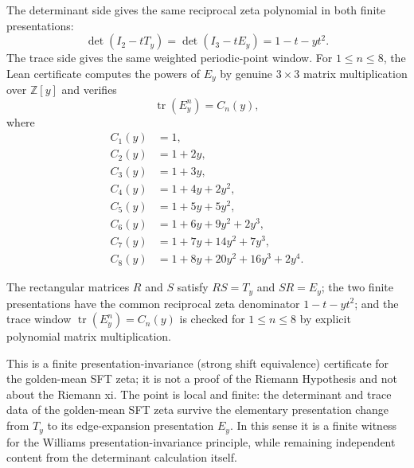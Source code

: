 The determinant side gives the same reciprocal zeta polynomial in both finite presentations:
$$
\det(I_2-tT_y)=\det(I_3-tE_y)=1-t-yt^2.
$$
The trace side gives the same weighted periodic-point window. For $1\le n\le 8$, the Lean certificate computes the powers of $E_y$ by genuine $3\times3$ matrix multiplication over $\mathbb Z[y]$ and verifies
$$
\operatorname{tr}(E_y^n)=C_n(y),
$$
where
$$
\begin{aligned}
C_1(y)&=1,\\
C_2(y)&=1+2y,\\
C_3(y)&=1+3y,\\
C_4(y)&=1+4y+2y^2,\\
C_5(y)&=1+5y+5y^2,\\
C_6(y)&=1+6y+9y^2+2y^3,\\
C_7(y)&=1+7y+14y^2+7y^3,\\
C_8(y)&=1+8y+20y^2+16y^3+2y^4.
\end{aligned}
$$

\begin{theorem}
\label{thm:window6-golden-mean-shift-equivalence-certificate}
The rectangular matrices $R$ and $S$ satisfy $RS=T_y$ and $SR=E_y$; the two finite presentations have the common reciprocal zeta denominator $1-t-yt^2$; and the trace window $\operatorname{tr}(E_y^n)=C_n(y)$ is checked for $1\le n\le 8$ by explicit polynomial matrix multiplication.
\end{theorem}

This is a finite presentation-invariance (strong shift equivalence) certificate for the golden-mean SFT zeta; it is not a proof of the Riemann Hypothesis and not about the Riemann xi. The point is local and finite: the determinant and trace data of the golden-mean SFT zeta survive the elementary presentation change from $T_y$ to its edge-expansion presentation $E_y$. In this sense it is a finite witness for the Williams presentation-invariance principle, while remaining independent content from the determinant calculation itself.



